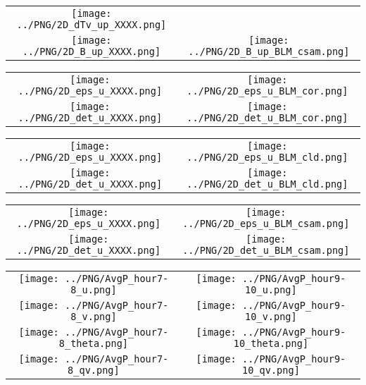 \documentclass{article}
\begin{document}
\newpage

\begin{table}
  \begin{tabular}{cc}
     \texttt{[image: ../PNG/2D\_dTv\_up\_XXXX.png]} & \\%
     \texttt{[image: ../PNG/2D\_B\_up\_XXXX.png]}   & \texttt{[image: ../PNG/2D\_B\_up\_BLM\_csam.png]}
  \end{tabular}
\end{table}

\newpage

\begin{table}
  \begin{tabular}{cc}
     \texttt{[image: ../PNG/2D\_eps\_u\_XXXX.png]} & \texttt{[image: ../PNG/2D\_eps\_u\_BLM\_cor.png]}\\
     \texttt{[image: ../PNG/2D\_det\_u\_XXXX.png]} & \texttt{[image: ../PNG/2D\_det\_u\_BLM\_cor.png]}
  \end{tabular}
\end{table}

\newpage

\begin{table}
  \begin{tabular}{cc}
     \texttt{[image: ../PNG/2D\_eps\_u\_XXXX.png]} & \texttt{[image: ../PNG/2D\_eps\_u\_BLM\_cld.png]}\\
     \texttt{[image: ../PNG/2D\_det\_u\_XXXX.png]} & \texttt{[image: ../PNG/2D\_det\_u\_BLM\_cld.png]}
  \end{tabular}
\end{table}

\newpage

\begin{table}
  \begin{tabular}{cc}
     \texttt{[image: ../PNG/2D\_eps\_u\_XXXX.png]} & \texttt{[image: ../PNG/2D\_eps\_u\_BLM\_csam.png]}\\
     \texttt{[image: ../PNG/2D\_det\_u\_XXXX.png]} & \texttt{[image: ../PNG/2D\_det\_u\_BLM\_csam.png]}
  \end{tabular}
\end{table}

\newpage

\begin{table}
  \begin{tabular}{cc}
     \texttt{[image: ../PNG/AvgP\_hour7-8\_u.png]}     & \texttt{[image: ../PNG/AvgP\_hour9-10\_u.png]}     \\
     \texttt{[image: ../PNG/AvgP\_hour7-8\_v.png]}     & \texttt{[image: ../PNG/AvgP\_hour9-10\_v.png]}     \\
     \texttt{[image: ../PNG/AvgP\_hour7-8\_theta.png]} & \texttt{[image: ../PNG/AvgP\_hour9-10\_theta.png]} \\
     \texttt{[image: ../PNG/AvgP\_hour7-8\_qv.png]}    & \texttt{[image: ../PNG/AvgP\_hour9-10\_qv.png]}
  \end{tabular}
\end{table}
\end{document}
